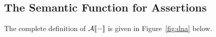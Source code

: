 \documentclass[11pt]{report}
\begin{document}
% 
% 
% 		
% 		
% 		
% 		
% 		
% 		
% 		
% 		
% 		
% 	
% 	
% 
% 

\subsection{The Semantic Function for Assertions}

The complete definition of $\mathcal{A}[\![-]\!]$ is given in Figure~\ref{fig:dna} below.
\end{document}
